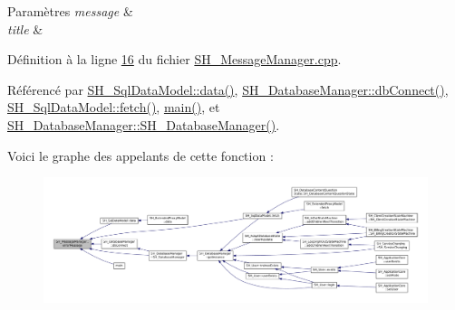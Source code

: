 \begin{DoxyParams}{Paramètres}
{\em message} & \\
\hline
{\em title} & \\
\hline
\end{DoxyParams}


Définition à la ligne \hyperlink{SH__MessageManager_8cpp_source_l00016}{16} du fichier \hyperlink{SH__MessageManager_8cpp_source}{S\-H\-\_\-\-Message\-Manager.\-cpp}.



Référencé par \hyperlink{classSH__SqlDataModel_aa4664329d52c2d2cba2bacc42fa1a564}{S\-H\-\_\-\-Sql\-Data\-Model\-::data()}, \hyperlink{classSH__DatabaseManager_ab634ce39ef483e7ad2fe08d4b8ba74f7}{S\-H\-\_\-\-Database\-Manager\-::db\-Connect()}, \hyperlink{classSH__SqlDataModel_ab6c206088250a66ddc8cb8d33a38e421}{S\-H\-\_\-\-Sql\-Data\-Model\-::fetch()}, \hyperlink{main_8cpp_a3c04138a5bfe5d72780bb7e82a18e627}{main()}, et \hyperlink{classSH__DatabaseManager_a7b5d0e372c153eb59cdab98588994904}{S\-H\-\_\-\-Database\-Manager\-::\-S\-H\-\_\-\-Database\-Manager()}.




Voici le graphe des appelants de cette fonction \-:
\nopagebreak
\begin{figure}[H]
\begin{center}
\leavevmode
\includegraphics[width=350pt]{classSH__MessageManager_a0cb4f06cf67539457482ba1c8544eb06_icgraph}
\end{center}
\end{figure}


